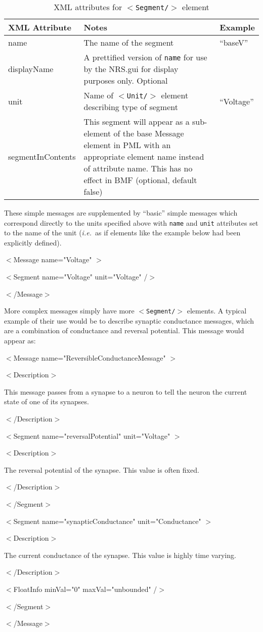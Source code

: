 \documentclass[pdftex,a4paper]{article}
\newcommand{\ie}{{\em i.e.\ }}
\newcommand{\XML}[2][]{{\tt \small $<$#2#1/$>$}}
\newcommand{\XMLfont}[1]{{\tt \small #1}}
\newcommand{\XMLtext}[1]{
  \begin{tt}
    \begin{small}
      \begin{list}{}{
          \setlength{\topsep}{0pt}
          \setlength{\partopsep}{0pt}
          \setlength{\itemsep}{0pt}
          \setlength{\parsep}{0pt}
          \setlength{\leftmargin}{2em}
          \setlength{\rightmargin}{2em}
          \setlength{\labelsep}{0pt}
        }
      \item #1
      \end{list}
    \end{small}
  \end{tt}
}
\newcommand{\XMLfull}[3][]{\XMLtext{$<$#2#1$>$
    #3
  \item $<$/#2$>$}}
\newcommand{\XMLsimple}[2][]{\XMLtext{$<$#2#1/$>$}}
\begin{document}
\begin{table}[!h]
  \begin{center}
    \caption{XML attributes for \XML{Segment} element}
    \label{tab:segment}
    \begin{tabular}{|l|p{6cm}|p{3cm}|}
      \hline

      \textbf{XML Attribute} & \textbf{Notes} & \textbf{Example}\\

      \hline

      name & The name of the segment &``baseV''\\

      \hline

      displayName & A prettified version of \XMLfont{name} for use by
      the NRS.gui for display purposes only. Optional & \\

      \hline

      unit & Name of \XML{Unit} element describing type of segment &
      ``Voltage''\\

      \hline

      segmentInContents & This segment will appear as a sub-element of
      the base Message element in PML with an appropriate element name
      instead of attribute name. This has no effect in BMF (optional,
      default false) & \\

      \hline

    \end{tabular}
  \end{center}
\end{table}

These simple messages are supplemented by ``basic'' simple messages
which correspond directly to the units specified above with
\XMLfont{name} and \XMLfont{unit} attributes set to the name of the unit
(\ie as if elements like the example below had been explicitly defined).

\XMLfull[ name="Voltage" ]{Message}{
  \XMLsimple[ name="Voltage" unit="Voltage" ]{Segment}
}

More complex messages simply have more \XML{Segment} elements. A
typical example of their use would be to describe synaptic conductance
messages, which are a combination of conductance and reversal
potential. This message would appear as:

\XMLfull[ name="ReversibleConductanceMessage" ]{Message}{
  \XMLfull{Description}{
    \XMLtext{This message passes from a synapse to a neuron to tell
    the neuron the current state of one of its synapses.}
  }
  \XMLfull[ name="reversalPotential" unit="Voltage" ]{Segment}{
    \XMLfull{Description}{
      \XMLtext{The reversal potential of the synapse. This value is
      often fixed.}
    }
  }
  \XMLfull[ name="synapticConductance" unit="Conductance" ]{Segment}{
    \XMLfull{Description}{
      \XMLtext{The current conductance of the synapse. This value is
        highly time varying.}
    }
    \XMLsimple[ minVal="0" maxVal="unbounded" ]{FloatInfo}
  }
}
\end{document}
